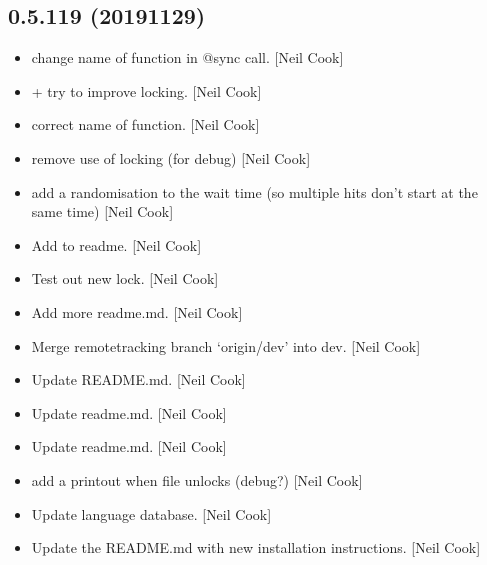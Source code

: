 \documentclass[a4paper,10pt,english]{report}
\begin{document}
\subsection{0.5.119 (2019\sphinxhyphen{}11\sphinxhyphen{}29)}
\label{\detokenize{misc/changelog:id42}}\begin{itemize}
\item {} 
 \sphinxhyphen{} change name of function in @sync call. {[}Neil Cook{]}

\item {} 
 +  \sphinxhyphen{} try to improve locking. {[}Neil Cook{]}

\item {} 
 \sphinxhyphen{} correct name of function. {[}Neil Cook{]}

\item {} 
 \sphinxhyphen{} remove use of locking (for debug) {[}Neil Cook{]}

\item {} 
 \sphinxhyphen{} add a randomisation to the wait time (so multiple
hits don’t start at the same time) {[}Neil Cook{]}

\item {} 
Add to readme. {[}Neil Cook{]}

\item {} 
Test out new lock. {[}Neil Cook{]}

\item {} 
Add more readme.md. {[}Neil Cook{]}

\item {} 
Merge remote\sphinxhyphen{}tracking branch ‘origin/dev’ into dev. {[}Neil Cook{]}

\item {} 
Update README.md. {[}Neil Cook{]}

\item {} 
Update readme.md. {[}Neil Cook{]}

\item {} 
Update readme.md. {[}Neil Cook{]}

\item {} 
 \sphinxhyphen{} add a printout when file unlocks (debug?) {[}Neil Cook{]}

\item {} 
Update language database. {[}Neil Cook{]}

\item {} 
Update the README.md with new installation instructions. {[}Neil Cook{]}


\end{itemize}
\end{document}
